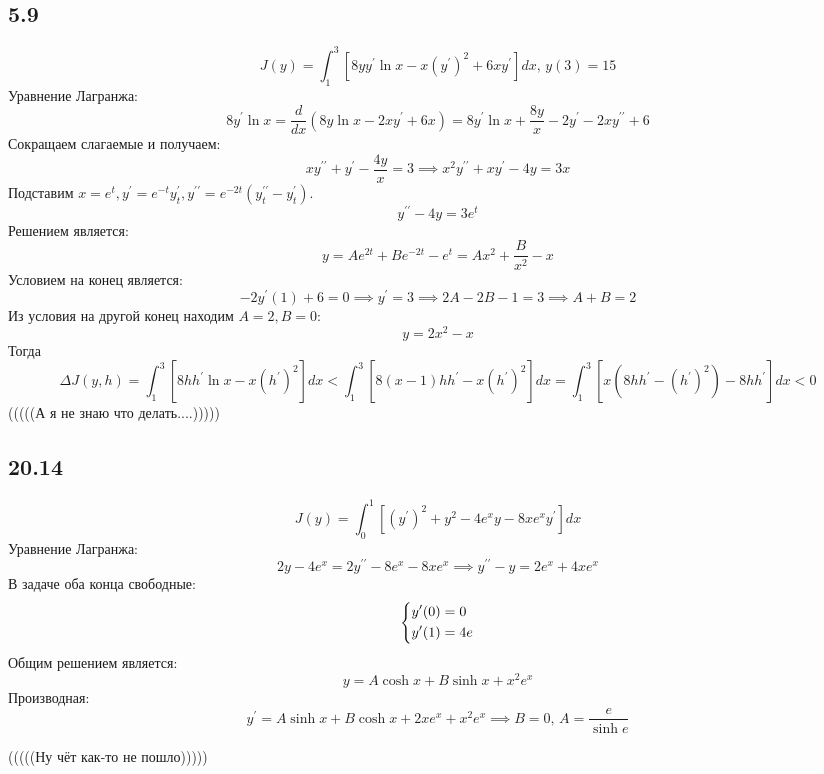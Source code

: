 \documentclass[12pt]{article}
\begin{document}
\subsection*{5.9}
\[
    J(y) = \int_{1}^{3} [8y y^{\prime} \ln x - x(y^{\prime} )^2 + 6xy^{\prime}]dx, \, y(3) = 15
\]
Уравнение Лагранжа: 
\[
    8y^{\prime} \ln x = \frac{d}{dx} (8y\ln x - 2xy^{\prime} + 6x) = 
    8y^{\prime} \ln x + \frac{8y}{x} - 2y^{\prime} - 2xy^{\prime\prime} + 6
\]
Сокращаем слагаемые и получаем: 
\[
    xy^{\prime\prime} + y^{\prime} - \frac{4y}{x} = 3 \implies 
    x^2 y^{\prime\prime} + xy^{\prime} - 4y = 3x  
\]
Подставим $x = e^t, y^{\prime} = e^{-t} y^{\prime}_t, y^{\prime\prime} = e^{-2t} (y^{\prime\prime}_t - y^{\prime}_t)$.
\[
    y^{\prime\prime} - 4y = 3e^t
\]
Решением является: 
\[
    y = Ae^{2t} + Be^{-2t} - e^t = A x^2 + \frac{B}{x^2} - x
\]
Условием на конец является: 
\[
    - 2 y^{\prime}(1) + 6 = 0 \implies y^{\prime} = 3 \implies 
    2A - 2B - 1 = 3 \implies A + B = 2
\]
Из условия на другой конец находим $A = 2, B = 0$:
\[
    y = 2x^2 - x
\] 
Тогда 
\[
    \Delta J(y, h) = \int_{1}^{3} [8 h h^{\prime} \ln x - x (h^{\prime})^2] dx < 
    \int_{1}^{3} [8 (x - 1) h h^{\prime} - x (h^{\prime})^2] dx = 
    \int_{1}^{3} [x (8h h^{\prime} - (h^{\prime})^2) - 8h h^{\prime}]dx < 0
\]
(((((А я не знаю что делать....)))))
\subsection*{20.14}
\[
    J(y) = \int_{0}^{1} [(y^{\prime})^2 + y^2 - 4e^x y - 8x e^x y^{\prime}] dx 
\]
Уравнение Лагранжа: 
\[
    2y - 4e^x = 2y^{\prime\prime} - 8 e^x - 8x e^x \implies 
    y^{\prime\prime} - y = 2e^x + 4x e^x
\]
В задаче оба конца свободные: 
\[
    \begin{dcases}
        y^{\prime}(0) = 0 \\
        y^{\prime}(1) = 4e
    \end{dcases}
\] 
Общим решением является: 
\[
    y = A \cosh x + B \sinh x + x^2 e^x
\]
Производная: 
\[
    y^{\prime} = A \sinh x + B \cosh x + 2x e^x + x^2 e^x \implies B = 0, \, A = \frac{e}{\sinh e}
\]

(((((Ну чёт как-то не пошло)))))
\end{document}
